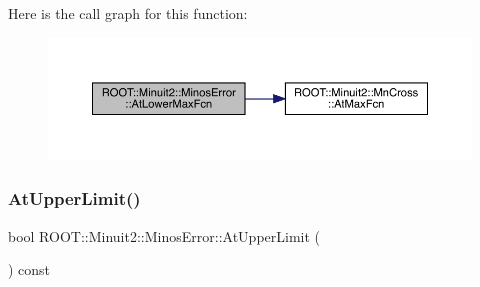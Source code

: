Here is the call graph for this function\+:
\nopagebreak
\begin{figure}[H]
\begin{center}
\leavevmode
\includegraphics[width=350pt]{d2/dd1/classROOT_1_1Minuit2_1_1MinosError_a6ec22eac3b7dd1a281f1df710ed1dc74_cgraph}
\end{center}
\end{figure}
\mbox{\label{classROOT_1_1Minuit2_1_1MinosError_a6c8a60e5b855f9d7164f441ea69c75eb}} 
\subsubsection{\texorpdfstring{AtUpperLimit()}{AtUpperLimit()}\hspace{0.1cm}{\footnotesize\ttfamily [1/2]}}
{\footnotesize\ttfamily bool R\+O\+O\+T\+::\+Minuit2\+::\+Minos\+Error\+::\+At\+Upper\+Limit (\begin{DoxyParamCaption}{ }\end{DoxyParamCaption}) const\hspace{0.3cm}{\ttfamily [inline]}}


